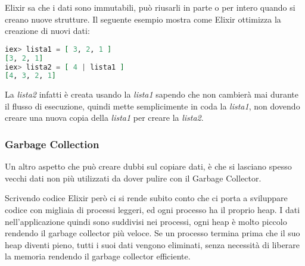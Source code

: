 Elixir sa che i dati sono immutabili, può riusarli in parte o per
intero quando si creano nuove strutture.
Il seguente esempio mostra come Elixir ottimizza la creazione di
nuovi dati:

\begin{lstlisting}[language=elixir]
iex> lista1 = [ 3, 2, 1 ]
[3, 2, 1]
iex> lista2 = [ 4 | lista1 ]
[4, 3, 2, 1]
\end{lstlisting}

La \textit{lista2} infatti è creata usando la \textit{lista1}
sapendo che non cambierà mai durante il flusso di esecuzione,
quindi mette semplicimente in coda la \textit{lista1}, non dovendo
creare una nuova copia della \textit{lista1} per creare 
la \textit{lista2}.

\subsubsection{Garbage Collection}
Un altro aspetto che può creare dubbi sul copiare dati, è che
si lasciano spesso vecchi dati non più utilizzati da dover
pulire con il Garbage Collector.

Scrivendo codice Elixir però ci si rende subito conto
che ci porta a sviluppare codice con migliaia di processi leggeri,
ed ogni processo ha il proprio heap. I dati nell'applicazione quindi
sono suddivisi nei processi, ogni heap è molto piccolo rendendo
il garbage collector più veloce. Se un processo termina prima che
il suo heap diventi pieno, tutti i suoi dati vengono eliminati, senza necessità
di liberare la memoria rendendo il garbage collector
efficiente. \cite{programming_elixir_immutability}

